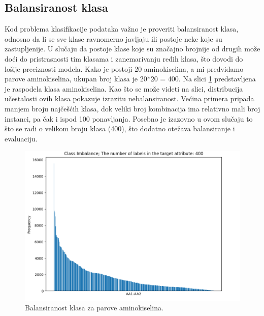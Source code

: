 \documentclass[a4paper,12pt]{article}
\begin{document}
\subsection{Balansiranost klasa}
Kod problema klasifikacije podataka važno je proveriti balansiranost klasa, odnosno da li se sve klase ravnomerno javljaju ili postoje neke koje su zastupljenije. U slučaju da postoje klase koje su značajno brojnije od drugih može doći do pristrasnosti tim klasama i zanemarivanju ređih klasa, što dovodi do lošije preciznosti modela.
Kako je postoji 20 aminokiselina, a mi predviđamo parove aminokiselina, ukupan broj klasa je 20*20 = 400. Na slici \ref{Slika:aa_imbalance} predstavljena je raspodela klasa aminokiselina.
Kao što se može videti na slici, distribucija učestalosti ovih klasa pokazuje izrazitu nebalansiranost. Većina primera pripada manjem broju najčešćih klasa, dok veliki broj kombinacija ima relativno mali broj instanci, pa čak i ispod 100 ponavljanja. Posebno je izazovno u ovom slučaju to što se radi o velikom broju klasa (400), što dodatno otežava balansiranje i evaluaciju.
\\
\begin{figure}[htbp]
    \centering
    \includegraphics[width=1\textwidth]{./images/aa_imbalance.png}
    \caption{Balansiranost klasa za parove aminokiselina.}
    \label{Slika:aa_imbalance}
\end{figure}
\end{document}
